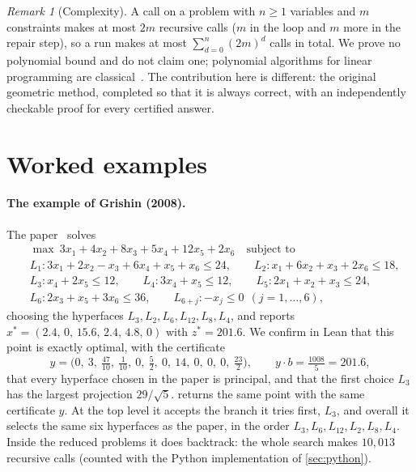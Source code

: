 \documentclass[11pt,a4paper]{article}
\theoremstyle{plain}
\theoremstyle{definition}
\theoremstyle{remark}
\newtheorem*{remark}{Remark}
\begin{document}
\begin{remark}[Complexity]\label{rem:complexity}
A call on a problem with $n\ge1$ variables and $m$ constraints makes at most $2m$ recursive
calls ($m$ in the loop and $m$ more in the repair step), so a run makes at most
$\sum_{d=0}^{n}(2m)^d$ calls in total. We prove no polynomial bound and do not claim one;
polynomial algorithms for linear programming are classical~\cite{khachiyan1979,karmarkar1984}.
The contribution here is different: the original geometric method, completed so that it is
always correct, with an independently checkable proof for every certified answer.
\end{remark}

\section{Worked examples}\label{sec:examples}

\paragraph{The example of Grishin (2008).} The paper~\cite{grishin2008} solves
\[
\begin{aligned}
&\max\ 3x_1+4x_2+8x_3+5x_4+12x_5+2x_6 \quad\text{subject to}\\
&L_1\colon 3x_1+2x_2-x_3+6x_4+x_5+x_6\le24,\qquad L_2\colon x_1+6x_2+x_3+2x_6\le18,\\
&L_3\colon x_4+2x_5\le12,\qquad L_4\colon 3x_4+x_5\le12,\qquad L_5\colon 2x_1+x_2+x_3\le24,\\
&L_6\colon 2x_3+x_5+3x_6\le36,\qquad L_{6+j}\colon -x_j\le0\ \ (j=1,\dots,6),
\end{aligned}
\]
choosing the hyperfaces $L_3, L_2, L_6, L_{12}, L_8, L_4$, and reports
$x^*=(2.4,\,0,\,15.6,\,2.4,\,4.8,\,0)$ with $z^*=201.6$. We confirm in Lean that this point is
exactly optimal, with the certificate
\[
  y = \bigl(0,\ 3,\ \tfrac{47}{10},\ \tfrac1{10},\ 0,\ \tfrac52,\ 0,\ 14,\ 0,\ 0,\ 0,\ \tfrac{23}{2}\bigr),
  \qquad y\cdot b = \tfrac{1008}{5}=201.6,
\]
that every hyperface chosen in the paper is principal, and that the first choice $L_3$ has the
largest projection $29/\sqrt5$.  returns the same point with the same
certificate $y$. At the top level it accepts the branch it tries first, $L_3$, and overall it
selects the same six hyperfaces as the paper, in the order $L_3, L_6, L_{12}, L_2, L_8, L_4$.
Inside the reduced problems it does backtrack: the whole search makes $10{,}013$ recursive calls (counted with the
Python implementation of \cref{sec:python}).
\end{document}
